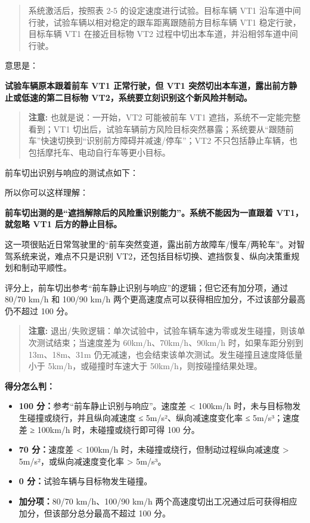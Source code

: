 \begin{quote}
  系统激活后，按照表 2-5 的设定速度进行试验。目标车辆 VT1 沿车道中间行驶，试验车辆以相对稳定的跟车距离跟随前方目标车辆 VT1 稳定行驶，目标车辆 VT1 在接近目标物 VT2 过程中切出本车道，并沿相邻车道中间行驶。
\end{quote}

意思是：

\textbf{试验车辆原本跟着前车 VT1 正常行驶，但 VT1 突然切出本车道，露出前方静止或低速的第二目标物 VT2，系统要立刻识别这个新风险并制动。}

\begin{quote}
  \textbf{注意:} 也就是说：一开始，VT2 可能被前车 VT1 遮挡，系统不一定能完整看到；VT1 切出后，试验车辆前方风险目标突然暴露；系统要从“跟随前车”快速切换到“识别前方障碍并减速/停车”；VT2 不只包括静止车辆，也包括摩托车、电动自行车等更小目标。
\end{quote}

前车切出识别与响应的测试点如下：

所以你可以这样理解：

\textbf{前车切出测的是“遮挡解除后的风险重识别能力”。系统不能因为一直跟着 VT1，就忽略 VT1 后方的静止目标。}

这一项很贴近日常驾驶里的“前车突然变道，露出前方故障车/慢车/两轮车”。对智驾系统来说，难点不只是识别 VT2，还包括目标切换、遮挡恢复、纵向决策重规划和制动平顺性。

评分上，前车切出参考“前车静止识别与响应”的逻辑；但它还有加分项，通过 80/70 km/h 和 100/90 km/h 两个更高速度点可以获得相应加分，不过该部分最高仍不超过 100 分。

\begin{quote}
  \textbf{注意:} 退出/失败逻辑：单次试验中，试验车辆车速为零或发生碰撞，则该单次测试结束；当速度差为 60km/h、70km/h、90km/h 时，如果车距分别到 13m、18m、31m 仍无减速，也会结束该单次测试。发生碰撞且速度降低量小于 5km/h，或碰撞时车速大于 50km/h，则按碰撞结果处理。
\end{quote}

\textbf{得分怎么判：}

\begin{itemize}
  \item \textbf{100 分：}参考“前车静止识别与响应”。速度差 < 100km/h 时，未与目标物发生碰撞或绕行，并且纵向减速度 ≤ 5m/s²、纵向减速度变化率 ≤ 5m/s³；速度差 ≥ 100km/h 时，未碰撞或绕行即可得 100 分。
  \item \textbf{70 分：}速度差 < 100km/h 时，未碰撞或绕行，但制动过程纵向减速度 > 5m/s²，或纵向减速度变化率 > 5m/s³。
  \item \textbf{0 分：}试验车辆与目标物发生碰撞。
  \item \textbf{加分项：}80/70 km/h、100/90 km/h 两个高速度切出工况通过后可获得相应加分，但该部分总分最高不超过 100 分。
\end{itemize}

